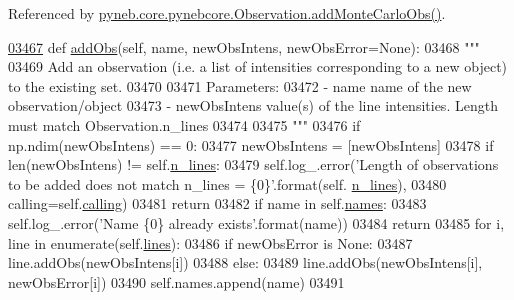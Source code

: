Referenced by \hyperlink{pynebcore_8py_source_l03947}{pyneb.\+core.\+pynebcore.\+Observation.\+add\+Monte\+Carlo\+Obs()}.


\begin{DoxyCode}
\hypertarget{classpyneb_1_1core_1_1pynebcore_1_1_observation_l03467}{}\hyperlink{classpyneb_1_1core_1_1pynebcore_1_1_observation_a301e67ff50a467e97cd929039607a5d0}{03467}     \textcolor{keyword}{def }\hyperlink{classpyneb_1_1core_1_1pynebcore_1_1_observation_a301e67ff50a467e97cd929039607a5d0}{addObs}(self, name, newObsIntens, newObsError=None):
03468         \textcolor{stringliteral}{"""}
03469 \textcolor{stringliteral}{        Add an observation (i.e. a list of intensities corresponding to a new object) to the existing set.}
03470 \textcolor{stringliteral}{}
03471 \textcolor{stringliteral}{        Parameters:}
03472 \textcolor{stringliteral}{            - name            name of the new observation/object}
03473 \textcolor{stringliteral}{            - newObsIntens    value(s) of the line intensities. Length must match Observation.n\_lines}
03474 \textcolor{stringliteral}{                }
03475 \textcolor{stringliteral}{        """}
03476         \textcolor{keywordflow}{if} np.ndim(newObsIntens) == 0:
03477             newObsIntens = [newObsIntens]
03478         \textcolor{keywordflow}{if} len(newObsIntens) != self.\hyperlink{classpyneb_1_1core_1_1pynebcore_1_1_observation_ac61184d33006ae92f2a3ed42adc149be}{n\_lines}:
03479             self.log\_.error(\textcolor{stringliteral}{'Length of observations to be added does not match n\_lines = \{0\}'}.format(self.
      \hyperlink{classpyneb_1_1core_1_1pynebcore_1_1_observation_ac61184d33006ae92f2a3ed42adc149be}{n\_lines}),
03480                             calling=self.\hyperlink{classpyneb_1_1core_1_1pynebcore_1_1_observation_a2639fad9af4fefad20e4097295bd40e7}{calling})
03481             \textcolor{keywordflow}{return}
03482         \textcolor{keywordflow}{if} name \textcolor{keywordflow}{in} self.\hyperlink{classpyneb_1_1core_1_1pynebcore_1_1_observation_a3f365d0b1488b2eba300bf71caf23c17}{names}:
03483             self.log\_.error(\textcolor{stringliteral}{'Name \{0\} already exists'}.format(name))
03484             \textcolor{keywordflow}{return}
03485         \textcolor{keywordflow}{for} i, line \textcolor{keywordflow}{in} enumerate(self.\hyperlink{classpyneb_1_1core_1_1pynebcore_1_1_observation_a78332043ca9f290590edf6b8a1e5b767}{lines}):
03486             \textcolor{keywordflow}{if} newObsError \textcolor{keywordflow}{is} \textcolor{keywordtype}{None}:
03487                 line.addObs(newObsIntens[i])
03488             \textcolor{keywordflow}{else}:
03489                 line.addObs(newObsIntens[i], newObsError[i])
03490         self.names.append(name)
03491 
\end{DoxyCode}
\hypertarget{classpyneb_1_1core_1_1pynebcore_1_1_observation_a823a1fa51f042f2734cbc323c6a7d4bb}{}
